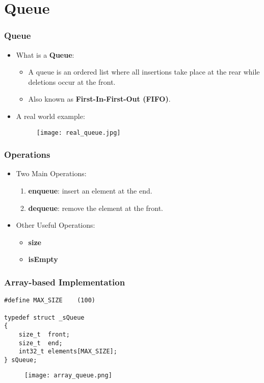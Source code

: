 \documentclass[11pt]{beamer}
\begin{document}
\section{Queue}

\begin{frame}
\frametitle{Queue}
\begin{itemize}
\item What is a {\bf\color{purple}Queue}:
    \begin{itemize}
    \item A queue is an {\color{red}ordered list} where {\color{blue}all insertions take place at the rear} while {\color{brown}deletions occur at the front}.
    \item Also known as {\bf\color{magenta}\Large First-In-First-Out (FIFO)}.
    \end{itemize}
\item A real world example:
    \begin{figure}
    \centering
    \texttt{[image: real\_queue.jpg]}
    \end{figure}
\end{itemize}
\end{frame}

\begin{frame}
\frametitle{Operations}
\begin{itemize}
\item Two Main Operations:
    \begin{enumerate}
    \item {\bf\color{red}enqueue}: insert an element at the end.
    \item {\bf\color{red}dequeue}: remove the element at the front.
    \end{enumerate}
\item Other Useful Operations:
    \begin{itemize}
    \item {\bf\color{blue}size}
    \item {\bf\color{blue}isEmpty}
    \end{itemize}
\end{itemize}
\end{frame}

\begin{frame}[fragile]
\frametitle{Array-based Implementation}
\begin{lstlisting}
#define MAX_SIZE    (100)

typedef struct _sQueue
{
    size_t  front;
    size_t  end;
    int32_t elements[MAX_SIZE];
} sQueue;
\end{lstlisting}
\begin{figure}
\centering
\texttt{[image: array\_queue.png]}
\end{figure}
\end{frame}
\end{document}

